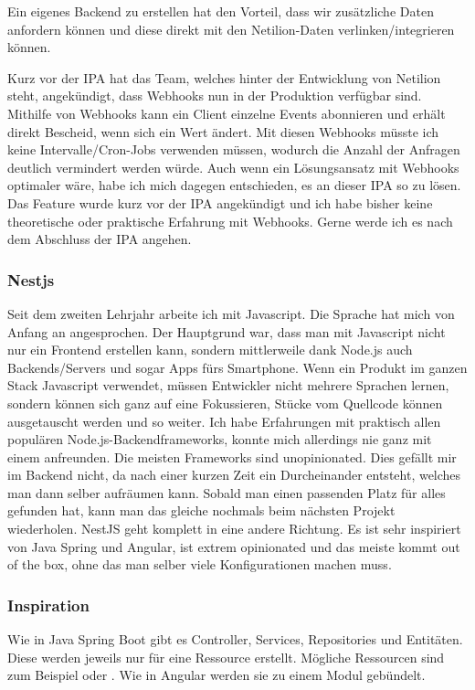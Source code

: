 Ein eigenes Backend zu erstellen hat den Vorteil, dass wir zusätzliche Daten anfordern können und diese direkt mit den Netilion-Daten verlinken/integrieren können.


Kurz vor der IPA hat das Team, welches hinter der Entwicklung von Netilion steht, angekündigt, dass Webhooks nun in der Produktion verfügbar sind. Mithilfe von Webhooks kann ein Client einzelne Events abonnieren und erhält direkt Bescheid, wenn sich ein Wert ändert. Mit diesen Webhooks müsste ich keine Intervalle/Cron-Jobs verwenden müssen, wodurch die Anzahl der Anfragen deutlich vermindert werden würde.
\newline
Auch wenn ein Lösungsansatz mit Webhooks optimaler wäre, habe ich mich dagegen entschieden, es an dieser IPA so zu lösen. Das Feature wurde kurz vor der IPA angekündigt und ich habe bisher keine theoretische oder praktische Erfahrung mit Webhooks. Gerne werde ich es nach dem Abschluss der IPA angehen.
\subsubsection{Nestjs}
Seit dem zweiten Lehrjahr arbeite ich mit Javascript. Die Sprache hat mich von Anfang an angesprochen. Der Hauptgrund war, dass man mit Javascript nicht nur ein Frontend erstellen kann, sondern mittlerweile dank Node.js auch Backends/Servers und sogar Apps fürs Smartphone. Wenn ein Produkt im ganzen Stack Javascript verwendet, müssen Entwickler nicht mehrere Sprachen lernen, sondern können sich ganz auf eine Fokussieren, Stücke vom Quellcode können ausgetauscht werden und so weiter.
\newline
Ich habe Erfahrungen mit praktisch allen populären Node.js-Backendframeworks, konnte mich allerdings nie ganz mit einem anfreunden. Die meisten Frameworks sind unopinionated. Dies gefällt mir im Backend nicht, da nach einer kurzen Zeit ein Durcheinander entsteht, welches man dann selber aufräumen kann. Sobald man einen passenden Platz für alles gefunden hat, kann man das gleiche nochmals beim nächsten Projekt wiederholen.
\newline
NestJS geht komplett in eine andere Richtung. Es ist sehr inspiriert von Java Spring und Angular, ist extrem opinionated und das meiste kommt out of the box, ohne das man selber viele Konfigurationen machen muss.
\subsubsection{Inspiration}
Wie in Java Spring Boot gibt es Controller, Services, Repositories und Entitäten. Diese werden jeweils nur für eine Ressource erstellt. Mögliche Ressourcen sind zum Beispiel  oder . Wie in Angular werden sie zu einem Modul gebündelt.
